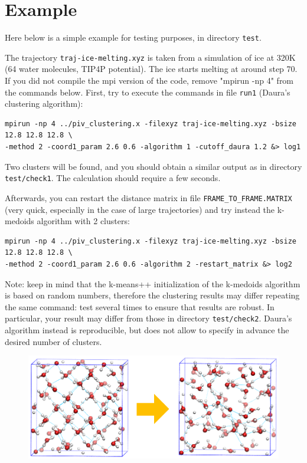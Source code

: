 \documentclass[a4paper,11pt]{article}
\begin{document}
                        
\newpage                        
\section{Example}
  Here below is a simple example for testing purposes, in directory \texttt{test}. 

  The trajectory \texttt{traj-ice-melting.xyz} is taken from a simulation of ice at 320K
  (64 water molecules, TIP4P potential). The ice starts melting at around step 70.
  If you did not compile the mpi version of the code, remove "mpirun -np 4" from the commands below.
  First, try to execute the commands in file \texttt{run1} (Daura's clustering algorithm):
  \begin{verbatim}
mpirun -np 4 ../piv_clustering.x -filexyz traj-ice-melting.xyz -bsize 12.8 12.8 12.8 \ 
-method 2 -coord1_param 2.6 0.6 -algorithm 1 -cutoff_daura 1.2 &> log1
  \end{verbatim}
  Two clusters will be found, and you should obtain a similar output as in directory \texttt{test/check1}. 
  The calculation should require a few seconds.

  Afterwards, you can restart the distance matrix in file \texttt{FRAME\_TO\_FRAME.MATRIX} (very quick, especially in the case of large trajectories) 
  and try instead the k-medoids algorithm with 2 clusters:
  \begin{verbatim}
mpirun -np 4 ../piv_clustering.x -filexyz traj-ice-melting.xyz -bsize 12.8 12.8 12.8 \
-method 2 -coord1_param 2.6 0.6 -algorithm 2 -restart_matrix &> log2
  \end{verbatim}
  Note: keep in mind that the k-means++ initialization of the k-medoids algorithm is based on random numbers, 
  therefore the clustering results may differ repeating the same command: test several times to 
  ensure that results are robust.
  In particular, your result may differ from those in directory \texttt{test/check2}.
  Daura's algorithm instead is reproducible, but does not allow to specify in advance the desired number of clusters.
\begin{figure}[!ht]
  \centering
  \includegraphics[width=12cm]{./ice-melting.eps}
\end{figure}

\newpage

\end{document}
